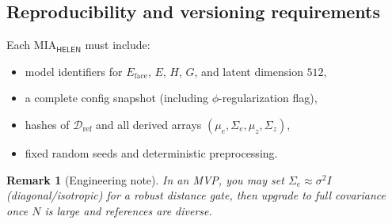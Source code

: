 \documentclass[12pt]{amsart}
\numberwithin{equation}{section}
\newtheorem{remark}[definition]{Remark}
\begin{document}
\subsection{Reproducibility and versioning requirements}
Each $\mathrm{MIA}_{\textsf{HELEN}}$ must include:
\begin{itemize}
\item model identifiers for $E_{\text{face}}$, $E$, $H$, $G$, and latent dimension $512$,
\item a complete config snapshot (including $\phi$-regularization flag),
\item hashes of $\mathcal{D}_{\text{ref}}$ and all derived arrays $(\mu_e,\Sigma_e,\mu_z,\Sigma_z)$,
\item fixed random seeds and deterministic preprocessing.
\end{itemize}

\begin{remark}[Engineering note]
In an MVP, you may set $\Sigma_e\approx \sigma^2 I$ (diagonal/isotropic) for a robust
distance gate, then upgrade to full covariance once $N$ is large and references are diverse.
\end{remark}
\end{document}
